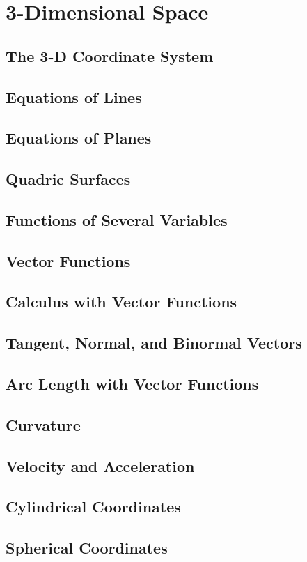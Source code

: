 \documentclass[../satmath.tex]{subfiles}
\begin{document}
\chapter{3-Dimensional Space}
\section{The 3-D Coordinate System}
\section{Equations of Lines}
\section{Equations of Planes}
\section{Quadric Surfaces}
\section{Functions of Several Variables}
\section{Vector Functions}
\section{Calculus with Vector Functions}
\section{Tangent, Normal, and Binormal Vectors}
\section{Arc Length with Vector Functions}
\section{Curvature}
\section{Velocity and Acceleration}
\section{Cylindrical Coordinates}
\section{Spherical Coordinates}
\end{document}
